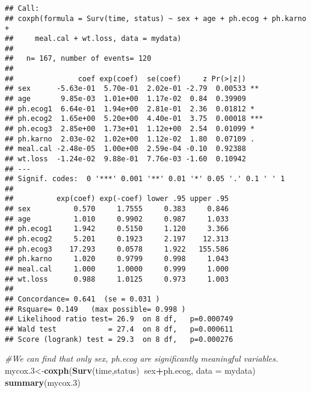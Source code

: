 \documentclass[]{book}
\newenvironment{Shaded}{\begin{snugshade}}{\end{snugshade}}
\newcommand{\KeywordTok}[1]{\textcolor[rgb]{0.13,0.29,0.53}{\textbf{#1}}}
\newcommand{\DataTypeTok}[1]{\textcolor[rgb]{0.13,0.29,0.53}{#1}}
\newcommand{\DecValTok}[1]{\textcolor[rgb]{0.00,0.00,0.81}{#1}}
\newcommand{\CommentTok}[1]{\textcolor[rgb]{0.56,0.35,0.01}{\textit{#1}}}
\newcommand{\OperatorTok}[1]{\textcolor[rgb]{0.81,0.36,0.00}{\textbf{#1}}}
\newcommand{\NormalTok}[1]{#1}
\theoremstyle{definition}
\theoremstyle{definition}
\theoremstyle{definition}
\theoremstyle{remark}
\begin{document}
\begin{verbatim}
## Call:
## coxph(formula = Surv(time, status) ~ sex + age + ph.ecog + ph.karno + 
##     meal.cal + wt.loss, data = mydata)
## 
##   n= 167, number of events= 120 
## 
##               coef exp(coef)  se(coef)     z Pr(>|z|)    
## sex      -5.63e-01  5.70e-01  2.02e-01 -2.79  0.00533 ** 
## age       9.85e-03  1.01e+00  1.17e-02  0.84  0.39909    
## ph.ecog1  6.64e-01  1.94e+00  2.81e-01  2.36  0.01812 *  
## ph.ecog2  1.65e+00  5.20e+00  4.40e-01  3.75  0.00018 ***
## ph.ecog3  2.85e+00  1.73e+01  1.12e+00  2.54  0.01099 *  
## ph.karno  2.03e-02  1.02e+00  1.12e-02  1.80  0.07109 .  
## meal.cal -2.48e-05  1.00e+00  2.59e-04 -0.10  0.92388    
## wt.loss  -1.24e-02  9.88e-01  7.76e-03 -1.60  0.10942    
## ---
## Signif. codes:  0 '***' 0.001 '**' 0.01 '*' 0.05 '.' 0.1 ' ' 1
## 
##          exp(coef) exp(-coef) lower .95 upper .95
## sex          0.570     1.7555     0.383     0.846
## age          1.010     0.9902     0.987     1.033
## ph.ecog1     1.942     0.5150     1.120     3.366
## ph.ecog2     5.201     0.1923     2.197    12.313
## ph.ecog3    17.293     0.0578     1.922   155.586
## ph.karno     1.020     0.9799     0.998     1.043
## meal.cal     1.000     1.0000     0.999     1.000
## wt.loss      0.988     1.0125     0.973     1.003
## 
## Concordance= 0.641  (se = 0.031 )
## Rsquare= 0.149   (max possible= 0.998 )
## Likelihood ratio test= 26.9  on 8 df,   p=0.000749
## Wald test            = 27.4  on 8 df,   p=0.000611
## Score (logrank) test = 29.3  on 8 df,   p=0.000276
\end{verbatim}

\begin{Shaded}
\begin{Highlighting}[]
\CommentTok{#We can find that only sex, ph.ecog are significantly meaningful variables.}
\NormalTok{mycox.}\DecValTok{3}\NormalTok{<-}\KeywordTok{coxph}\NormalTok{(}\KeywordTok{Surv}\NormalTok{(time,status)}\OperatorTok{~}\NormalTok{sex}\OperatorTok{+}\NormalTok{ph.ecog, }\DataTypeTok{data =}\NormalTok{ mydata)}
\KeywordTok{summary}\NormalTok{(mycox.}\DecValTok{3}\NormalTok{)}
\end{Highlighting}
\end{Shaded}
\end{document}
